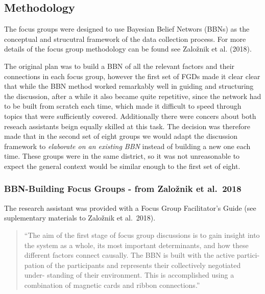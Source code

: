 \documentclass[]{article}
\begin{document}
\hypertarget{methodology}{%
\subsection{Methodology}\label{methodology}}

The focus groups were designed to use Bayesian Belief Networs (BBNs) as
the conceptual and strucutral framework of the data collection process.
For more details of the focus group methodology can be found see
Založnik et al. (2018).

The original plan was to build a BBN of all the relevant factors and
their connections in each focus group, however the first set of FGDs
made it clear clear that while the BBN method worked remarkably well in
guiding and structuring the discussion, after a while it also became
quite repetitive, since the network had to be built from scratch each
time, which made it difficult to speed through topics that were
sufficiently covered. Additionally there were concers about both reseach
assistants beign equally skilled at this task. The decision was
therefore made that in the second set of eight groups we would adapt the
discussion framework to \emph{elaborate on an existing BBN} instead of
building a new one each time. These groups were in the same district, so
it was not unreasonable to expect the general context would be similar
enough to the first set of eight.

\hypertarget{bbn-building-focus-groups---from-zaloznik-et-al.2018}{%
\subsubsection{BBN-Building Focus Groups - from Založnik et
al.~2018}\label{bbn-building-focus-groups---from-zaloznik-et-al.2018}}

The research assistant was provided with a Focus Group Facilitator's
Guide (see suplementary materials to Založnik et al.~2018).

\begin{quote}
``The aim of the first stage of focus group discussions is to gain
insight into the system as a whole, its most important determinants, and
how these different factors connect causally. The BBN is built with the
active partici- pation of the participants and represents their
collectively negotiated under- standing of their environment. This is
accomplished using a combination of magnetic cards and ribbon
connections.''
\end{quote}
\end{document}
